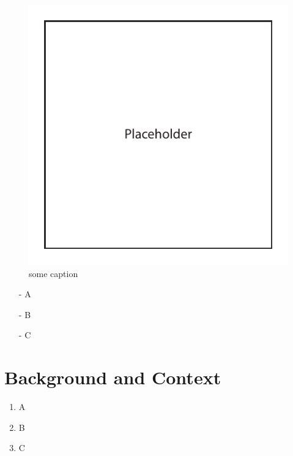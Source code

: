 \documentclass{epsrc}
\begin{document}
\begin{figure}[!htbp]
	\begin{center}
		\includegraphics{img/placeholder_image}
		\vspace{-30pt}
		\caption{some caption}
		\label{fig:full}
	\end{center}
\end{figure}

\lipsum[19-20]

\begin{itemize}
	\item[-]A
	\item[-]B
	\item[-]C
\end{itemize}

\section{Background and Context}

\lipsum[21-22]

\begin{enumerate}[label=\bfseries \arabic*:, align=left]
	\item A
	\item B
	\item C
\end{enumerate}

\lipsum[23-24]
\end{document}
